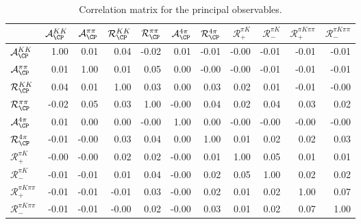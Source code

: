 \begin{table}
\centering
\scriptsize
\caption{Correlation matrix for the principal observables.}
\begin{tabular}{l|rrrrrrrrrr}
& $\mathcal{A}_{\CP}^{KK}$& $\mathcal{A}_{\CP}^{\pi\pi}$& $\mathcal{R}_{\CP}^{KK}$& $\mathcal{R}_{\CP}^{\pi\pi}$& $\mathcal{A}_{\CP}^{4\pi}$& $\mathcal{R}_{\CP}^{4\pi}$& $\mathcal{R}_+^{\pi K}$& $\mathcal{R}_-^{\pi K}$& $\mathcal{R}_+^{\pi K\pi\pi}$& $\mathcal{R}_-^{\pi K\pi\pi}$ \\
\midrule

$\mathcal{A}_{\CP}^{KK}$& 1.00& 0.01& 0.04& -0.02& 0.01& -0.01& -0.00& -0.01& -0.01& -0.01 \\

$\mathcal{A}_{\CP}^{\pi\pi}$& 0.01& 1.00& 0.01& 0.05& 0.00& -0.00& -0.00& -0.01& -0.01& -0.01 \\

$\mathcal{R}_{\CP}^{KK}$& 0.04& 0.01& 1.00& 0.03& 0.00& 0.03& 0.02& 0.01& -0.01& -0.00 \\

$\mathcal{R}_{\CP}^{\pi\pi}$& -0.02& 0.05& 0.03& 1.00& -0.00& 0.04& 0.02& 0.04& 0.03& 0.02 \\

$\mathcal{A}_{\CP}^{4\pi}$& 0.01& 0.00& 0.00& -0.00& 1.00& 0.00& -0.00& -0.00& -0.00& -0.00 \\

$\mathcal{R}_{\CP}^{4\pi}$& -0.01& -0.00& 0.03& 0.04& 0.00& 1.00& 0.01& 0.02& 0.02& 0.03 \\

$\mathcal{R}_+^{\pi K}$& -0.00& -0.00& 0.02& 0.02& -0.00& 0.01& 1.00& 0.05& 0.01& 0.01 \\

$\mathcal{R}_-^{\pi K}$& -0.01& -0.01& 0.01& 0.04& -0.00& 0.02& 0.05& 1.00& 0.02& 0.02 \\

$\mathcal{R}_+^{\pi K\pi\pi}$& -0.01& -0.01& -0.01& 0.03& -0.00& 0.02& 0.01& 0.02& 1.00& 0.07 \\

$\mathcal{R}_-^{\pi K\pi\pi}$& -0.01& -0.01& -0.00& 0.02& -0.00& 0.03& 0.01& 0.02& 0.07& 1.00 \\
\end{tabular}
\end{table}
\label{tab:correlation}
